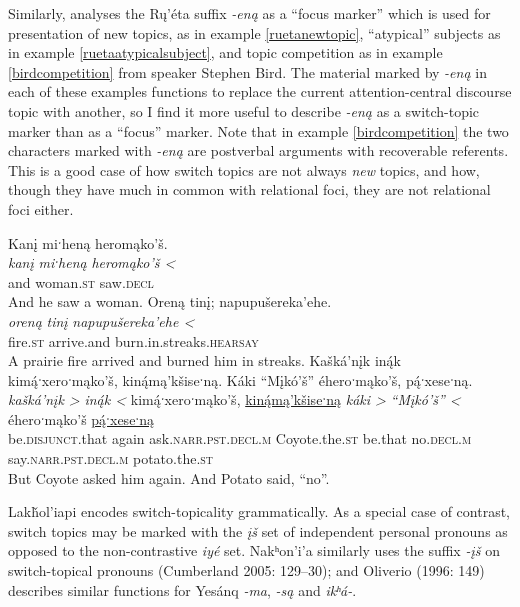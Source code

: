 \documentclass[output=paper]{LSP/langsci}
\begin{document}
	Similarly, \citet{Wolvengrey1990} analyses the Rų’éta suffix \emph{-eną} as a “focus marker” which is used for presentation of new topics, as in example \ref{ruetanewtopic}, “atypical” subjects as in example \ref{ruetaatypicalsubject}, and topic competition as in example \ref{birdcompetition} from speaker Stephen Bird. The material marked by \emph{-eną} in each of these examples functions to replace the current attention-central discourse topic with another, so I find it more useful to describe \emph{-eną} as a switch-topic marker than as a “focus” marker. Note that in example \ref{birdcompetition} the two characters marked with \emph{-eną} are postverbal arguments with recoverable referents. This is a good case of how switch topics are not always \emph{new} topics, and how, though they have much in common with relational foci, they are not relational foci either.

\ea\label{ruetaswitchtopic}
\ea\label{ruetanewtopic}
Kanį miˑheną heromąko’š.\footnotemark\\
\gll 	\emph{kanį}	 	\emph{miˑheną} 	\emph{heromąko’š <}\\
	and 			woman.\textsc{st} 	saw.\textsc{decl}\\
\glt	And he saw a woman.
\ex\label{ruetaatypicalsubject}
Oreną tinį; napupušereka’ehe.\footnotemark\\
\gll 	\emph{oreną}	\emph{tinį}	\emph{napupušereka’ehe <}\\
	fire.\textsc{st} 	arrive.and 	burn.in.streaks.\textsc{hearsay}\\
\glt	A prairie fire arrived and burned him in streaks.
\ex\label{birdcompetition}
Kašká’nįk in\'{ą}k kim\'{ą}ˑxeroˑmąko’š, kin\'{ą}mą’kšiseˑną. Káki “Mįkó’š” éheroˑmąko’š, p\'{ą}ˑxeseˑną.\footnotemark\\
\gll 	\emph{kašká’nįk >}		\emph{in\'{ą}k <} 	kim\'{ą}ˑxeroˑmąko’š, 		\underline{kin\'{ą}mą’kšiseˑną}	\emph{káki >}	\emph{“Mįkó’š” <}			éheroˑmąko’š 			\underline{p\'{ą}ˑxeseˑną}\\
	be.\textsc{disjunct}.that 	again 			ask.\textsc{narr.pst.decl.m} 	Coyote.the.\textsc{st}		be.that 		no.\textsc{decl.m} 					say.\textsc{narr.pst.decl.m} 	potato.the.\textsc{st}\\
\glt	But Coyote asked him again. And Potato said, “no”.
\z\z

	Lakȟol’iapi encodes switch-topicality grammatically. As a special case of contrast, switch topics may be marked with the \emph{įš} set of independent personal pronouns as opposed to the non-contrastive \emph{iyé} set. Nakʰon’i’a similarly uses the suffix \emph{-įš} on switch-topical pronouns (Cumberland 2005: 129--30); and Oliverio (1996: 149) describes similar functions for Yesánq \emph{-ma}, \emph{-są} and \emph{ikʰá-}. 
	
\end{document}
